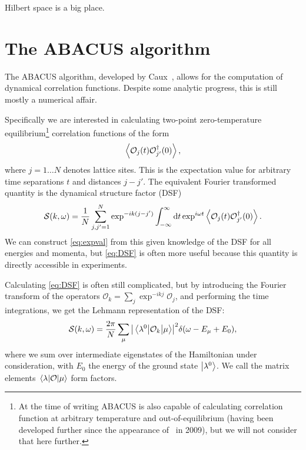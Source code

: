 \documentclass[11pt, a4paper]{report} %
\begin{document}
\begin{savequote}[50mm]
Hilbert space is a big place.
\end{savequote}


\chapter{The ABACUS algorithm}\label{chap:abacus}

The ABACUS algorithm, developed by Caux~\cite{Caux2005, Caux2007, Caux2007a, Caux2005a}, allows for the computation of dynamical correlation functions.
Despite some analytic progress, this is still mostly a numerical affair.

Specifically we are interested in calculating two-point zero-temperature equilibrium\footnote{At the time of writing ABACUS is also capable of calculating correlation function at arbitrary temperature and out-of-equilibrium (having been developed further since the appearance of~\cite{Caux2009} in 2009), but we will not consider that here further.} correlation functions of the form
\begin{equation}\label{eq:expval}
	\expval{\mathcal{O}_j(t)\mathcal{O}_{j'}^{\dagger}(0)},
\end{equation}
where \(j=1\ldots N\) denotes lattice sites.
This is the expectation value for arbitrary time separations $t$ and distances $j-j'$.
The equivalent Fourier transformed quantity is the dynamical structure factor (DSF)
\begin{equation}\label{eq:DSF}
	\mathcal{S}(k,\omega) = \frac{1}{N} \sum_{j,j'=1}^{N} \exp^{-ik(j-j')} \int_{-\infty}^{\infty}\dd t \exp^{i\omega t}\expval{\mathcal{O}_j(t)\mathcal{O}_{j'}^{\dagger}(0)}.
\end{equation}
We can construct \cref{eq:expval} from this given knowledge of the DSF for all energies and momenta, but \cref{eq:DSF} is often more useful because this quantity is directly accessible in experiments.%

Calculating \cref{eq:DSF} is often still complicated, but by introducing the Fourier transform of the operators $\mathcal{O}_k=\sum_j \exp^{-ikj} \mathcal{O}_j$, and performing the time integrations, we get the Lehmann representation of the DSF:\@
\begin{equation}
  \label{eq:lehman}
  \mathcal{S}(k,\omega) = \frac{2\pi}{N}\sum_{\mu}\abs{\mel{\lambda^0}{\mathcal{O}_k}{\mu}}^2 \delta\qty(\omega-E_{\mu}+E_0), 
\end{equation}
where we sum over intermediate eigenstates of the Hamiltonian under consideration, with $E_0$ the energy of the ground state $\ket{\lambda^0}$.
We call the matrix elements $\mel{\lambda}{\mathcal{O}}{\mu}$ form factors.
\end{document}
